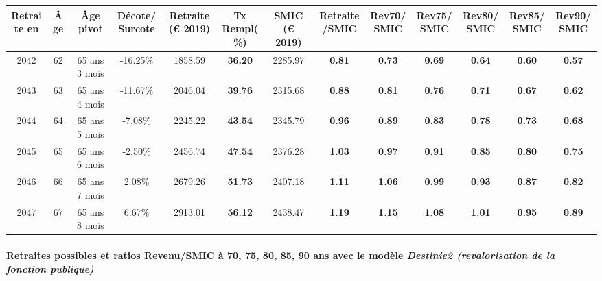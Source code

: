 { \scriptsize \begin{center} 
\begin{tabular}[htb]{|c|c||c|c||c|c||c||c|c|c|c|c|c|} 
\hline 
 Retraite en &  Âge &  Âge pivot &  Décote/Surcote &  Retraite (\euro{} 2019) &  Tx Rempl(\%) &  SMIC (\euro{} 2019) &  Retraite/SMIC &  Rev70/SMIC &  Rev75/SMIC &  Rev80/SMIC &  Rev85/SMIC &  Rev90/SMIC \\ 
\hline \hline 
 2042 &  62 &  65 ans 3 mois &  -16.25\% &  1858.59 &  {\bf 36.20} &  2285.97 &  {\bf {\color{red} 0.81}} &  {\bf {\color{red} 0.73}} &  {\bf {\color{red} 0.69}} &  {\bf {\color{red} 0.64}} &  {\bf {\color{red} 0.60}} &  {\bf {\color{red} 0.57}} \\ 
\hline 
 2043 &  63 &  65 ans 4 mois &  -11.67\% &  2046.04 &  {\bf 39.76} &  2315.68 &  {\bf {\color{red} 0.88}} &  {\bf {\color{red} 0.81}} &  {\bf {\color{red} 0.76}} &  {\bf {\color{red} 0.71}} &  {\bf {\color{red} 0.67}} &  {\bf {\color{red} 0.62}} \\ 
\hline 
 2044 &  64 &  65 ans 5 mois &  -7.08\% &  2245.22 &  {\bf 43.54} &  2345.79 &  {\bf {\color{red} 0.96}} &  {\bf {\color{red} 0.89}} &  {\bf {\color{red} 0.83}} &  {\bf {\color{red} 0.78}} &  {\bf {\color{red} 0.73}} &  {\bf {\color{red} 0.68}} \\ 
\hline 
 2045 &  65 &  65 ans 6 mois &  -2.50\% &  2456.74 &  {\bf 47.54} &  2376.28 &  {\bf 1.03} &  {\bf {\color{red} 0.97}} &  {\bf {\color{red} 0.91}} &  {\bf {\color{red} 0.85}} &  {\bf {\color{red} 0.80}} &  {\bf {\color{red} 0.75}} \\ 
\hline 
 2046 &  66 &  65 ans 7 mois &  2.08\% &  2679.26 &  {\bf 51.73} &  2407.18 &  {\bf 1.11} &  {\bf 1.06} &  {\bf {\color{red} 0.99}} &  {\bf {\color{red} 0.93}} &  {\bf {\color{red} 0.87}} &  {\bf {\color{red} 0.82}} \\ 
\hline 
 2047 &  67 &  65 ans 8 mois &  6.67\% &  2913.01 &  {\bf 56.12} &  2438.47 &  {\bf 1.19} &  {\bf 1.15} &  {\bf 1.08} &  {\bf 1.01} &  {\bf {\color{red} 0.95}} &  {\bf {\color{red} 0.89}} \\ 
\hline 
\hline 
\end{tabular} 
\end{center} } 
\paragraph{Retraites possibles et ratios Revenu/SMIC à 70, 75, 80, 85, 90 ans avec le modèle \emph{Destinie2 (revalorisation de la fonction publique)}}  
 
